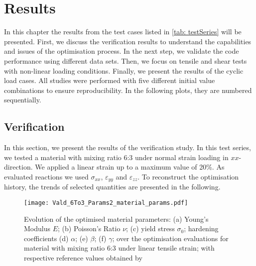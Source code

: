 \chapter{Results}\label{chap: results}

In this chapter the results from the test cases listed in \autoref{tab: testSeries} will be presented. First, we discuss the verification results to understand the capabilities and issues of the optimisation process. In the next step, we validate the code performance using different data sets. Then, we focus on tensile and shear tests with non-linear loading conditions. 
Finally, we present the results of the cyclic load cases. All studies were performed with five different initial value combinations to ensure reproducibility. In the following plots, they are numbered sequentially. 


\section{Verification}\label{sec: verification}

In this section, we present the results of the verification study. In this test series, we tested a material with mixing ratio 6:3 under normal strain loading in $xx$-direction.
We applied a linear strain up to a maximum value of 20\%. As evaluated reactions we used $\sigma_{xx}$, $\varepsilon_{yy}$ and $\varepsilon_{zz}$. To reconstruct the optimisation history, the trends of selected quantities are presented in the following.

\begin{figure}[H]
    \centering
    \texttt{[image: Vald\_6To3\_Params2\_material\_params.pdf]}
    \caption{Evolution of the optimised material parameters: (a) Young's Modulus $E$; (b) Poisson's Ratio $\nu$; (c) yield stress $\sigma_0$; hardening coefficients (d) $\alpha$; (e) $\beta$; (f) $\gamma$; over the optimisation evaluations for material with mixing ratio 6:3 under linear tensile strain; with respective reference values obtained by \citet{ries_deciphering_nodate}}
    \label{fig:verifMaterialParams}
\end{figure}


